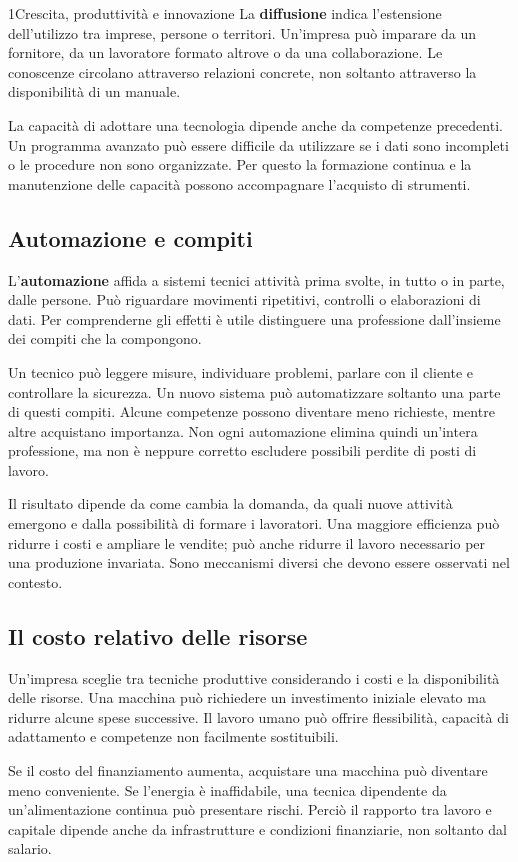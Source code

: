 \begin{lettura}{1}{Crescita, produttività e innovazione}
La \textbf{diffusione} indica l'estensione dell'utilizzo tra imprese, persone o territori. Un'impresa può imparare da un fornitore, da un lavoratore formato altrove o da una collaborazione. Le conoscenze circolano attraverso relazioni concrete, non soltanto attraverso la disponibilità di un manuale.

La capacità di adottare una tecnologia dipende anche da competenze precedenti. Un programma avanzato può essere difficile da utilizzare se i dati sono incompleti o le procedure non sono organizzate. Per questo la formazione continua e la manutenzione delle capacità possono accompagnare l'acquisto di strumenti.

\subsection*{Automazione e compiti}
L'\textbf{automazione} affida a sistemi tecnici attività prima svolte, in tutto o in parte, dalle persone. Può riguardare movimenti ripetitivi, controlli o elaborazioni di dati. Per comprenderne gli effetti è utile distinguere una professione dall'insieme dei compiti che la compongono.

Un tecnico può leggere misure, individuare problemi, parlare con il cliente e controllare la sicurezza. Un nuovo sistema può automatizzare soltanto una parte di questi compiti. Alcune competenze possono diventare meno richieste, mentre altre acquistano importanza. Non ogni automazione elimina quindi un'intera professione, ma non è neppure corretto escludere possibili perdite di posti di lavoro.

Il risultato dipende da come cambia la domanda, da quali nuove attività emergono e dalla possibilità di formare i lavoratori. Una maggiore efficienza può ridurre i costi e ampliare le vendite; può anche ridurre il lavoro necessario per una produzione invariata. Sono meccanismi diversi che devono essere osservati nel contesto.

\subsection*{Il costo relativo delle risorse}
Un'impresa sceglie tra tecniche produttive considerando i costi e la disponibilità delle risorse. Una macchina può richiedere un investimento iniziale elevato ma ridurre alcune spese successive. Il lavoro umano può offrire flessibilità, capacità di adattamento e competenze non facilmente sostituibili.

Se il costo del finanziamento aumenta, acquistare una macchina può diventare meno conveniente. Se l'energia è inaffidabile, una tecnica dipendente da un'alimentazione continua può presentare rischi. Perciò il rapporto tra lavoro e capitale dipende anche da infrastrutture e condizioni finanziarie, non soltanto dal salario.


\end{lettura}
